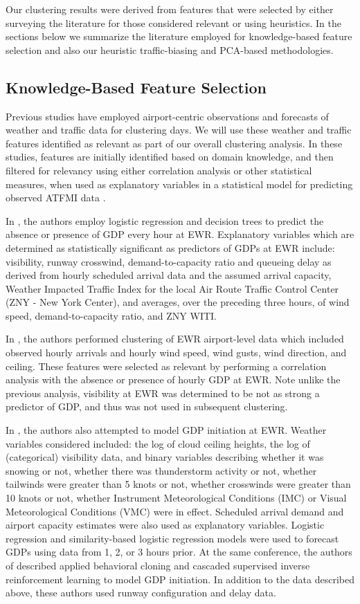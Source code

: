 \documentclass[11pt]{scrartcl}
\begin{document}
Our clustering results were derived from features that were selected by either surveying the literature for those considered relevant or using heuristics.  In the sections below we summarize the literature employed for knowledge-based feature selection and also our heuristic traffic-biasing and PCA-based methodologies.
\subsection{Knowledge-Based Feature Selection}
Previous studies have employed airport-centric observations and forecasts of weather and traffic data for clustering days.  We will use these weather and traffic features identified as relevant as part of our overall clustering analysis.  In these studies, features are initially identified based on domain knowledge, and then filtered for relevancy using either correlation analysis or other statistical measures, when used as explanatory variables in a statistical model for predicting observed ATFMI data \cite{mukherjeepredicting,grabbe2013similar}.  

In \cite{mukherjeepredicting}, the authors employ logistic regression and decision trees to predict the absence or presence of GDP every hour at EWR.  Explanatory variables which are determined as statistically significant as predictors of GDPs at EWR include: visibility, runway crosswind, demand-to-capacity ratio and queueing delay as derived from hourly scheduled arrival data and the assumed arrival capacity, Weather Impacted Traffic Index for the local Air Route Traffic Control Center (ZNY - New York Center), and averages, over the preceding three hours, of wind speed, demand-to-capacity ratio, and ZNY WITI.

In \cite{grabbe2013similar}, the authors performed clustering of EWR airport-level data which included observed hourly arrivals and hourly wind speed, wind gusts, wind direction, and ceiling.  These features were selected as relevant by performing a correlation analysis with the absence or presence of hourly GDP at EWR.  Note unlike the previous analysis, visibility at EWR was determined to be not as strong a predictor of GDP, and thus was not used in subsequent clustering.

In \cite{Hansen_informs}, the authors also attempted to model GDP initiation at EWR. Weather variables considered included: the log of cloud ceiling heights, the log of (categorical) visibility data, and binary variables describing whether it was snowing or not, whether there was thunderstorm activity or not, whether tailwinds were greater than 5 knots or not, whether crosswinds were greater than 10 knots or not, whether Instrument Meteorological Conditions (IMC) or Visual Meteorological Conditions (VMC) were in effect.  Scheduled arrival demand and airport capacity estimates were also used as explanatory variables.  Logistic regression and similarity-based logistic regression models were used to forecast GDPs using data from 1, 2, or 3 hours prior.  At the same conference, the authors of \cite{Bloem_informs} described applied behavioral cloning and cascaded supervised inverse reinforcement learning to model GDP initiation.  In addition to the data described above, these authors used runway configuration and delay data.
\end{document}
